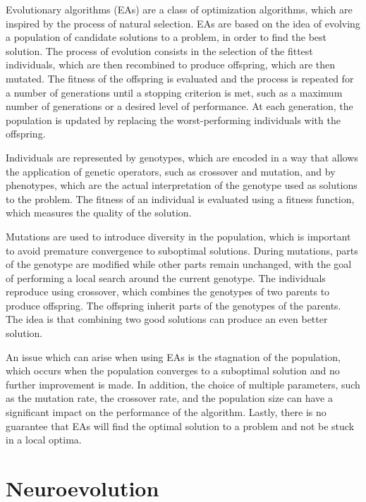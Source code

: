 Evolutionary algorithms (EAs) are a class of optimization algorithms, which are inspired by the process of natural selection. EAs are based on the idea of
evolving a population of candidate solutions to a problem, in order to find the best solution. The process of evolution consists in the selection of the
fittest individuals, which are then recombined to produce offspring, which are then mutated. The fitness of the offspring is evaluated and the process is
repeated for a number of generations until a stopping criterion is met, such as a maximum number of generations or a desired level of performance.
At each generation, the population is updated by replacing the worst-performing individuals with the offspring.

Individuals are represented by genotypes, which are encoded in a way that allows the application of genetic operators, such as crossover and mutation, and
by phenotypes, which are the actual interpretation of the genotype used as solutions to the problem. The fitness of an individual is evaluated using a
fitness function, which measures the quality of the solution.

Mutations are used to introduce diversity in the population, which is important to avoid premature convergence to suboptimal solutions. During mutations,
parts of the genotype are modified while other parts remain unchanged, with the goal of performing a local search around the current genotype.
The individuals reproduce using crossover, which combines the genotypes of two parents to produce offspring. The offspring inherit parts of the genotypes
of the parents. The idea is that combining two good solutions can produce an even better solution.


An issue which can arise when using EAs is the stagnation of the population, which occurs when the population converges to a suboptimal solution and
no further improvement is made. In addition, the choice of multiple parameters, such as the mutation rate, the crossover rate, and the population size
can have a significant impact on the performance of the algorithm. Lastly, there is no guarantee that EAs will find the optimal solution to a problem and
not be stuck in a local optima.

\section{Neuroevolution}

